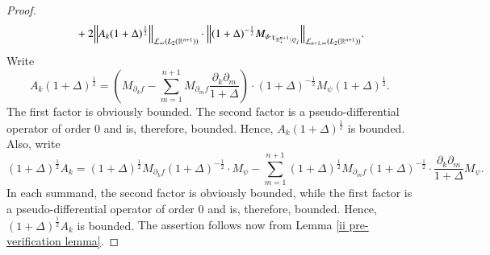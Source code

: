 \documentclass[12pt]{amsart}
\begin{document}
\begin{proof}
\begin{align*}
&\hspace{1.0cm}+2\Big\|A_k(1+\Delta)^{\frac12}\Big\|_{\mathcal{L}_{\infty}(L_2(\mathbb{R}^{n+1}))}\cdot \Big\|(1+\Delta)^{-\frac12}M_{\phi\cdot\chi_{\mathbb{R}^{n+1}_+\backslash Q_j}}\Big\|_{\mathcal{L}_{n+1,\infty}(L_2(\mathbb{R}^{n+1}))}.
\end{align*}
{\color{blue} Write
$$A_k(1+\Delta)^{\frac12}=\left(M_{\partial_k f}-\sum_{m=1}^{n+1}M_{\partial_m f}\frac{\partial_k\partial_m}{1+\Delta}\right)\cdot (1+\Delta)^{-\frac12}M_{\psi}(1+\Delta)^{\frac12}.$$
The first factor is obviously bounded. The second factor is a pseudo-differential operator of order $0$ and is, therefore, bounded. Hence, $A_k(1+\Delta)^{\frac12}$ is bounded.	Also, write
$$(1+\Delta)^{\frac12}A_k=(1+\Delta)^{\frac12}M_{\partial_kf}(1+\Delta)^{-\frac12}\cdot M_{\psi}-\sum_{m=1}^{n+1}(1+\Delta)^{\frac12}M_{\partial_mf}(1+\Delta)^{-\frac12}\cdot \frac{\partial_k\partial_m}{1+\Delta}M_{\psi}.$$
In each summand, the second factor is obviously bounded, while the first factor is a pseudo-differential operator of order $0$ and is, therefore, bounded. Hence, $(1+\Delta)^{\frac12}A_k$ is bounded.} The assertion follows now from Lemma \ref{ii pre-verification lemma}.
\end{proof}
\end{document}
